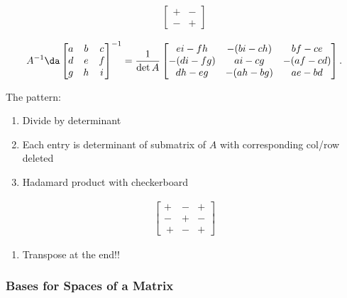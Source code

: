 \begin{example}

\begin{align*}
\begin{bmatrix}
+ & - \\
- & +
\end{bmatrix}
\end{align*}

\begin{align*}
A^{-1} \da
\begin{bmatrix}
a & b & c \\
d & e & f \\
g & h & i
\end{bmatrix}
^{-1} 
= 
{1 \over {\det A}} 
\begin{bmatrix}
e i - f h & -(b i - c h) & b f - c e \\ 
-(d i - f g) &a i - c g &-(a f -c d) \\ 
d h - e g & -(a h - b g)& a e - b d 
\end{bmatrix}
.\end{align*}

The pattern:

\begin{enumerate}
\def\labelenumi{\arabic{enumi}.}
\tightlist
\item
  Divide by determinant
\item
  Each entry is determinant of submatrix of \(A\) with corresponding
  col/row deleted
\item
  Hadamard product with checkerboard
\end{enumerate}

\begin{align*}
\begin{bmatrix}
+ & - & + \\ 
- & + & - \\  \
+ & - & + 
\end{bmatrix}
\end{align*}

\begin{enumerate}
\def\labelenumi{\arabic{enumi}.}
\setcounter{enumi}{3}
\tightlist
\item
  Transpose at the end!!
\end{enumerate}

\end{example}

\hypertarget{bases-for-spaces-of-a-matrix}{%
\subsubsection{Bases for Spaces of a
Matrix}\label{bases-for-spaces-of-a-matrix}}

